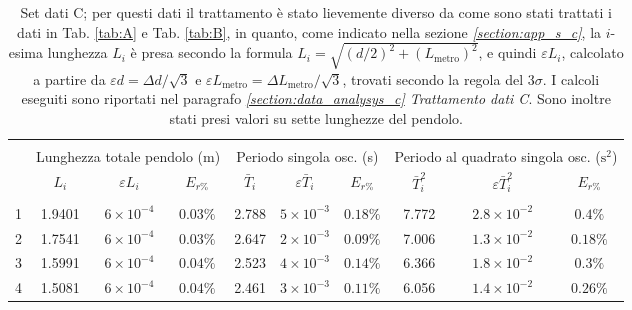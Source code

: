 \documentclass[italian, a4paper, 10pt, twocolumn]{../../style/lab_unige}
\newcommand{\reftab}[1]{Tab. {\ref{#1}}}%
\begin{document}
  \begin{table}[t!]
    \footnotesize
    \centering
    \caption{Set dati C; per questi dati il trattamento è stato lievemente diverso da come sono stati trattati 
    i dati in \reftab{tab:A} e \reftab{tab:B}, in quanto, come indicato nella sezione \textit{
    \ref{section:app_s_c}}, la  $i$-esima lunghezza $L_{i}$ è presa secondo la formula 
    $L_{i}=\sqrt{(d/2)^{2}+(L_{\text{metro}})^{2}}$, e quindi $\varepsilon L_{i}$, calcolato a partire da 
    $\varepsilon d=\Delta d/\sqrt{3}$ e $\varepsilon L_{\text{metro}}=\Delta L_{\text{metro}}/\sqrt{3}$, 
    trovati secondo la regola del $3\sigma$. I calcoli eseguiti sono riportati nel paragrafo
    \textit{\ref{section:data_analysys_c} Trattamento dati C}.
    Sono inoltre stati presi valori su sette lunghezze del pendolo.}
    \label{tab:C}
    \setlength{\tabcolsep}{1.985\tabcolsep}
    \begin{tabular}{lccccccccc}
      \hline\hline\\[-1.5ex]
        & \multicolumn{3}{c}{Lunghezza totale pendolo (m)}  & \multicolumn{3}{c}{Periodo singola osc. (s)}               & \multicolumn{3}{c}{Periodo al quadrato singola osc. ($\text{s}^{2}$)} \\[+0.5ex] 
        & $L_{i}$ & $\varepsilon L_{i}$ & $E_{r\%}$         & $\bar{T}_{i}$  & $\varepsilon\bar{T}_{i}$ & $E_{r\%}$ & $\bar{T}_{i}^{2}$ & $\varepsilon\bar{T}_{i}^{2}$ & $E_{r\%}$     \\[+0.5ex] \hline \\[-1.5ex]
      1 & 1.9401  & $6\times10^{-4}$    & $0.03\%$          & 2.788          & $5\times10^{-3}$         & $0.18\%$  & 7.772             & $2.8\times10^{-2}$           & $0.4\%$       \\[+0.5ex] %
      2 & 1.7541  & $6\times10^{-4}$    & $0.03\%$          & 2.647          & $2\times10^{-3}$         & $0.09\%$  & 7.006             & $1.3\times10^{-2}$           & $0.18\%$      \\[+0.5ex] %
      3 & 1.5991  & $6\times10^{-4}$    & $0.04\%$          & 2.523          & $4\times10^{-3}$         & $0.14\%$  & 6.366             & $1.8\times10^{-2}$           & $0.3\%$       \\[+0.5ex] %
      4 & 1.5081  & $6\times10^{-4}$    & $0.04\%$          & 2.461          & $3\times10^{-3}$         & $0.11\%$  & 6.056             & $1.4\times10^{-2}$           & $0.26\%$      \\[+0.5ex] %

\end{tabular}
\end{table}
\end{document}
